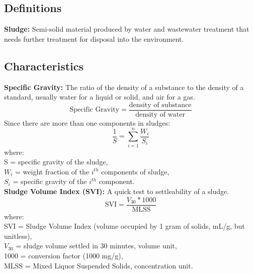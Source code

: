 \documentclass[a4paper, landscape]{article}
\begin{document}
\begin{multicols}{4} %
\subsection*{Definitions}
\textbf{Sludge:} Semi-solid material produced by water and wastewater treatment that needs further treatment for disposal into the environment.
\subsection*{Characteristics}
\textbf{Specific Gravity:} The ratio of the density of a substance to the density of a standard, usually water for a liquid or solid, and air for a gas.
\[
\text{Specific Gravity} = \frac{{\text{density of substance}}}{{\text{density of water}}}
\]
Since there are more than one components in sludges:
\[
\frac{1}{S} = \sum_{i=1}^{n} \frac{W_i}{S_i}
\]
where:\\
S = specific gravity of the sludge,\\
$W_i$ = weight fraction of the $i^{th}$ components of sludge,\\
$S_i$ = specific gravity of the $i^{th}$ component.\\
\textbf{Sludge Volume Index (SVI):} A quick test to settleability of a sludge.
\[
\text{SVI} = \frac{V_{30}*1000}{\text{MLSS}}
\]
where:\\
SVI = Sludge Volume Index (volume occupied by 1 gram of solids, mL/g, but unitless),\\
$V_{30}$ = sludge volume settled in 30 minutes, volume unit,\\
1000 = conversion factor (1000 mg/g),\\
MLSS = Mixed Liquor Suspended Solids, concentration unit.

\end{multicols}
\end{document}
